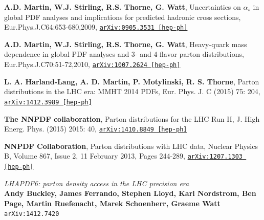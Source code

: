 \documentclass[11pt,a4paper,openright,twoside]{report}
\begin{document}
\begin{thebibliography}{9}
	\textbf{A.D. Martin, W.J. Stirling, R.S. Thorne, G. Watt}, Uncertainties on $\alpha_s$ in global PDF analyses and implications for predicted hadronic cross sections, Eur.Phys.J.C64:653-680,2009, \href{https://arxiv.org/abs/0905.3531}{\texttt{arXiv:0905.3531 [hep-ph]}}
	
	\textbf{A.D. Martin, W.J. Stirling, R.S. Thorne, G. Watt}, Heavy-quark mass dependence in global PDF analyses and 3- and 4-flavor parton distributions, Eur.Phys.J.C70:51-72,2010, \href{https://arxiv.org/abs/1007.2624}{\texttt{arXiv:1007.2624 [hep-ph]}}
	
	\textbf{L. A. Harland-Lang, A. D. Martin, P. Motylinski, R. S. Thorne}, Parton distributions in the LHC era: MMHT 2014 PDFs, Eur. Phys. J. C (2015) 75: 204, \href{https://arxiv.org/abs/1412.3989}{\texttt{arXiv:1412.3989 [hep-ph]}}
	
	\textbf{The NNPDF collaboration}, Parton distributions for the LHC Run II, J. High Energ. Phys. (2015) 2015: 40, \href{https://arxiv.org/abs/1410.8849}{\texttt{arXiv:1410.8849 [hep-ph]}}
	
\textbf{NNPDF Collaboration}, Parton distributions with LHC data, Nuclear Physics B, Volume 867, Issue 2, 11 February 2013, Pages 244-289, \href{https://arxiv.org/abs/1207.1303}{\texttt{arXiv:1207.1303 [hep-ph]}}
	
	\textit{LHAPDF6: parton density access in the LHC precision era}\\
	\textbf{Andy Buckley, James Ferrando, Stephen Lloyd, Karl Nordstrom, Ben Page, Martin Ruefenacht, Marek Schoenherr, Graeme Watt}\\
	\texttt{arXiv:1412.7420}


\end{thebibliography}
\end{document}

